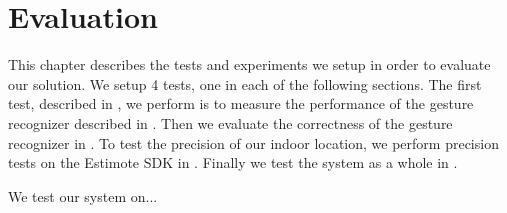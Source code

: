 \chapter{Evaluation}\label{chap:evaluation}
This chapter describes the tests and experiments we setup in order to evaluate our solution. 
We setup \num{4} tests, one in each of the following sections. 
The first test, described in , we perform is to measure the performance of the gesture recognizer described in . 
Then we evaluate the correctness of the gesture recognizer in .
To test the precision of our indoor location, we perform precision tests on the Estimote SDK in .
Finally we test the system as a whole in .

We test our system on...



